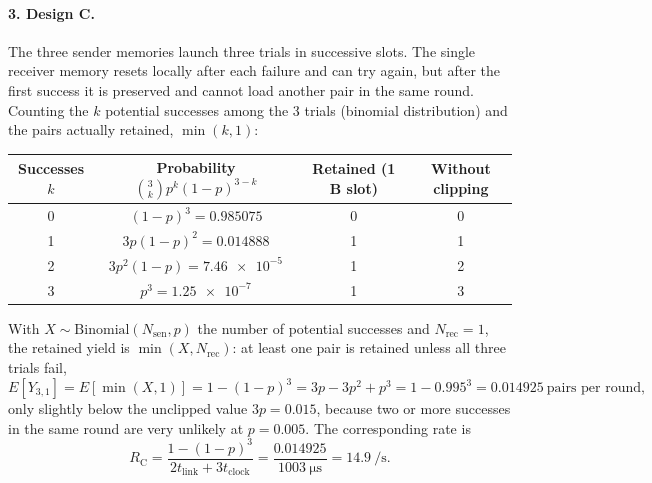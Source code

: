 \paragraph{3. Design C.}
The three sender memories launch three trials in successive slots. The single receiver memory resets locally
after each failure and can try again, but after the first success it is preserved and cannot load another pair
in the same round. Counting the $k$ potential successes among the 3 trials (binomial distribution) and the
pairs actually retained, $\min(k,1)$:
\begin{center}
\begin{tabular}{cccc}
  \toprule
  Successes $k$ & Probability $\binom{3}{k}p^k(1-p)^{3-k}$ & Retained (1 B slot) & Without clipping \\
  \midrule
  0 & $(1-p)^3 = 0.985075$     & 0 & 0 \\
  1 & $3p(1-p)^2 = 0.014888$   & 1 & 1 \\
  2 & $3p^2(1-p) = \num{7.46e-5}$ & 1 & 2 \\
  3 & $p^3 = \num{1.25e-7}$    & 1 & 3 \\
  \bottomrule
\end{tabular}
\end{center}
With $X\sim\mathrm{Binomial}(N_\mathrm{sen},p)$ the number of potential successes and $N_\mathrm{rec}=1$,
the retained yield is $\min(X,N_\mathrm{rec})$: at least one pair is retained unless all three trials fail,
\begin{equation}
  E[Y_{3,1}] = E[\min(X,1)] = 1-(1-p)^3 = 3p - 3p^2 + p^3 = 1 - 0.995^3 = 0.014925 \ \text{pairs per round},
\end{equation}
only slightly below the unclipped value $3p = 0.015$, because two or more successes in the same round are very
unlikely at $p = 0.005$. The corresponding rate is
\begin{equation}
  R_\mathrm{C} = \frac{1-(1-p)^3}{2t_\mathrm{link}+3t_\mathrm{clock}} = \frac{0.014925}{\SI{1003}{\micro\second}} = \SI{14.9}{\per\second}.
\end{equation}

